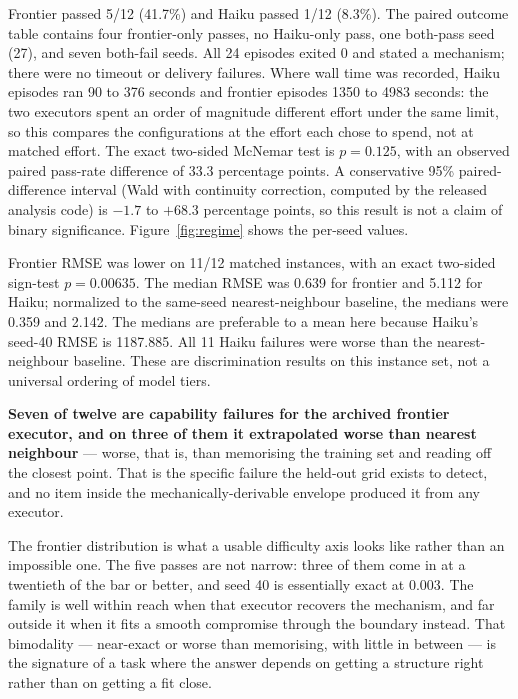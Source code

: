 Frontier passed 5/12 (41.7\%) and Haiku passed 1/12 (8.3\%). The paired outcome table
contains four frontier-only passes, no Haiku-only pass, one both-pass seed (27), and
seven both-fail seeds. All 24 episodes exited 0 and stated a mechanism; there were no
timeout or delivery failures. Where wall time was recorded, Haiku episodes ran 90 to
376 seconds and frontier episodes 1350 to 4983 seconds: the two executors spent an
order of magnitude different effort under the same limit, so this compares the
configurations at the effort each chose to spend, not at matched effort. The exact two-sided McNemar test is $p=0.125$, with an
observed paired pass-rate difference of 33.3 percentage points. A conservative 95\% paired-difference interval (Wald with continuity correction,
computed by the released analysis code) is $-1.7$ to $+68.3$ percentage points, so
this result is not a claim of binary significance. Figure~\ref{fig:regime} shows the
per-seed values.

Frontier RMSE was lower on 11/12 matched instances, with an exact two-sided sign-test
$p=0.00635$. The median RMSE was 0.639 for frontier and 5.112 for Haiku; normalized
to the same-seed nearest-neighbour baseline, the medians were 0.359 and 2.142.
The medians are preferable to a mean here because Haiku's seed-40 RMSE is 1187.885.
All 11 Haiku failures were worse than the nearest-neighbour baseline. These are
discrimination results on this instance set, not a universal ordering of model tiers.

\textbf{Seven of twelve are capability failures for the archived frontier executor, and on three of them it extrapolated worse than nearest neighbour} --- worse, that is, than memorising the training set and reading off the closest point. That is the specific failure the held-out grid exists to detect, and no item inside the mechanically-derivable envelope produced it from any executor.

The frontier distribution is what a usable difficulty axis looks like rather than an impossible one. The five passes are not narrow: three of them come in at a twentieth of the bar or better, and seed 40 is essentially exact at 0.003. The family is well within reach when that executor recovers the mechanism, and far outside it when it fits a smooth compromise through the boundary instead. That bimodality --- near-exact or worse than memorising, with little in between --- is the signature of a task where the answer depends on getting a structure right rather than on getting a fit close.

